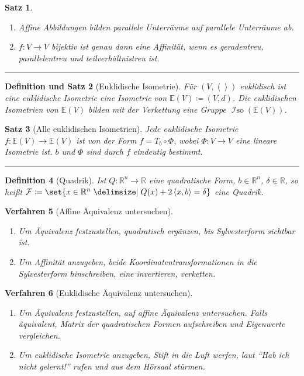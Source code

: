 \documentclass[a4paper]{article}
\newcounter{Sec}
\theoremstyle{marginbreak}
\newtheorem{definition}{Definition}[Sec]
\newtheorem{satz}[definition]{Satz}
\newtheorem{defsatz}[definition]{Definition und Satz}
\newtheorem{verfahren}[definition]{Verfahren}
\newcommand{\sep}{%
	\rule{\textwidth}{0.3pt}%
	\stepcounter{Sec}%
	}
\newcommand\scp[1]{\left\langle#1\right\rangle}
\begin{document}
	\begin{satz}
		\begin{enumerate}[label=(\alph*)]
			\item Affine Abbildungen bilden parallele Unterräume auf parallele Unterräume ab.
			\item $f\colon V\to V$ bijektiv ist genau dann eine Affinität, wenn es geradentreu,
				parallelentreu und teilverhältnistreu ist.
		\end{enumerate}
	\end{satz}
	\sep
	\begin{defsatz}[Euklidische Isometrie]
		Für $(V,\scp{})$ euklidisch ist eine euklidische Isometrie eine Isometrie
		von $\mathbb{E}(V)\coloneqq (V, d)$. Die euklidischen Isometrien von $\mathbb{E}(V)$
		bilden mit der Verkettung eine Gruppe $\operatorname{\mathcal{I}so}(\mathbb{E}(V))$.
	\end{defsatz}
	\begin{satz}[Alle euklidischen Isometrien]
		Jede euklidische Isometrie $f\colon\mathbb{E}(V)\to\mathbb{E}(V)$ ist von der Form
		$f=T_b\circ\Phi$, wobei $\Phi\colon V\to V$ eine lineare Isometrie ist. $b$ und $\Phi$
		sind durch $f$ eindeutig bestimmt.
	\end{satz}
	\sep
	\begin{definition}[Quadrik]
		Ist $Q\colon\mathbb{R}^n\to\mathbb{R}$ eine quadratische Form, $b\in\mathbb{R}^n$,
		$\delta\in\mathbb{R}$, so heißt $\mathcal{F}\coloneqq\set{x\in\mathbb{R}^n\given Q(x)+2\scp{x, b}=\delta}$
		eine Quadrik.
	\end{definition}
	\begin{verfahren}[Affine Äquivalenz untersuchen]
		\begin{enumerate}
			\item Um Äquivalenz festzustellen, quadratisch ergänzen, bis Sylvesterform sichtbar ist.
			\item Um Affinität anzugeben, beide Koordinatentransformationen in die Sylvesterform hinschreiben,
				eine invertieren, verketten.
		\end{enumerate}
	\end{verfahren}
	\begin{verfahren}[Euklidische Äquivalenz untersuchen]
		\begin{enumerate}
			\item Um Äquivalenz festzustellen, auf affine Äquivalenz untersuchen. Falls äquivalent,
				Matrix der quadratischen Formen aufschreiben und Eigenwerte vergleichen.
			\item Um euklidische Isometrie anzugeben, Stift in die Luft werfen, laut
				\enquote{Hab ich nicht gelernt!} rufen und aus dem Hörsaal stürmen.
		\end{enumerate}
	\end{verfahren}
\end{document}

